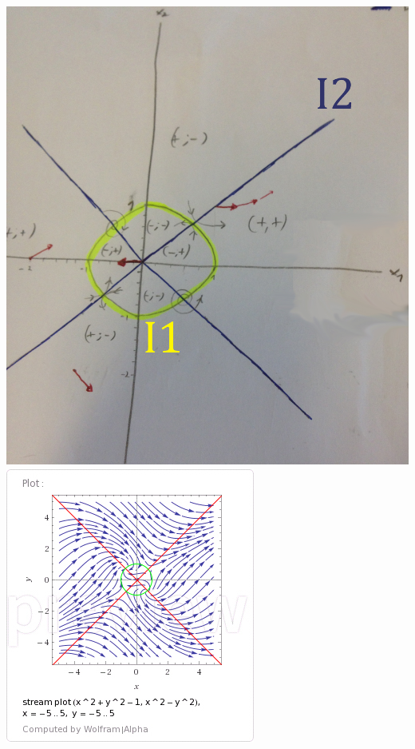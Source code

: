 \documentclass[11pt,a4paper]{report}
\begin{document}
			\includegraphics[width=\textwidth]{"portrait-de-phase"}
			\includegraphics[width=\textwidth]{portrait-de-phase_wolfram}
\end{document}
